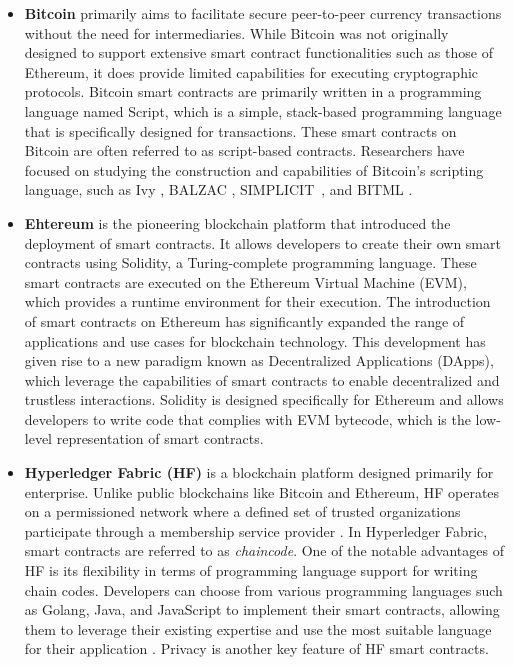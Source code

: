 \documentclass[manuscript,screen]{acmart}
\begin{document}
\begin{itemize}
  \item \textbf{Bitcoin} primarily aims to facilitate secure peer-to-peer currency transactions without the need for intermediaries. While Bitcoin was not originally designed to support extensive smart contract functionalities such as those of Ethereum, it does provide limited capabilities for executing cryptographic protocols. Bitcoin smart contracts are primarily written in a programming language named Script, which is a simple, stack-based programming language that is specifically designed for transactions. These smart contracts on Bitcoin are often referred to as script-based contracts. Researchers have focused on studying the construction and capabilities of Bitcoin's scripting language, such as Ivy \cite{ivy}, BALZAC \cite{AtzeiBLZ18}, SIMPLICIT~\cite{OConnor17}, and BITML \cite{AtzeiBLYZ19}. 
  
  \item \textbf{Ehtereum} is the pioneering blockchain platform that introduced the deployment of smart contracts. It allows developers to create their own smart contracts using Solidity, a Turing-complete programming language. These smart contracts are executed on the Ethereum Virtual Machine (EVM), which provides a runtime environment for their execution. The introduction of smart contracts on Ethereum has significantly expanded the range of applications and use cases for blockchain technology. This development has given rise to a new paradigm known as Decentralized Applications (DApps), which leverage the capabilities of smart contracts to enable decentralized and trustless interactions. Solidity is designed specifically for Ethereum and allows developers to write code that complies with EVM bytecode, which is the low-level representation of smart contracts.
  
  \item \textbf{Hyperledger Fabric (HF)}  is a blockchain platform designed primarily for enterprise. Unlike public blockchains like Bitcoin and Ethereum, HF operates on a permissioned network where a defined set of trusted organizations participate through a membership service provider \cite{AndroulakiBBCCC18}. In Hyperledger Fabric, smart contracts are referred to as \textit{chaincode}. One of the notable advantages of HF is its flexibility in terms of programming language support for writing chain codes. Developers can choose from various programming languages such as Golang, Java, and JavaScript to implement their smart contracts, allowing them to leverage their existing expertise and use the most suitable language for their application \cite{KhanLGBB21}. Privacy is another key feature of HF smart contracts.
  

\end{itemize}
\end{document}
